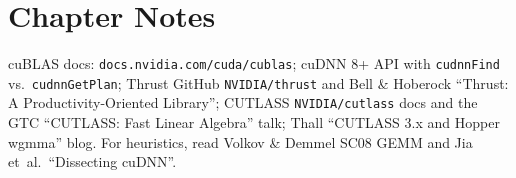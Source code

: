 \section{Chapter Notes}
cuBLAS docs: \texttt{docs.nvidia.com/cuda/cublas}; cuDNN 8+ API with \texttt{cudnnFind} vs.\ \texttt{cudnnGetPlan}; Thrust GitHub \texttt{NVIDIA/thrust} and Bell \& Hoberock ``Thrust: A Productivity-Oriented Library''; CUTLASS \texttt{NVIDIA/cutlass} docs and the GTC ``CUTLASS: Fast Linear Algebra'' talk; Thall ``CUTLASS 3.x and Hopper wgmma'' blog. For heuristics, read Volkov \& Demmel SC08 GEMM and Jia et~al.\ ``Dissecting cuDNN''.
